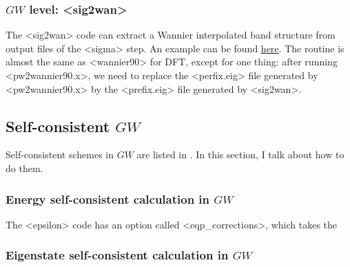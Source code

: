 \documentclass[hyperref, a4paper]{report}
\def\texttt#1{<#1>}%
\newcommand{\shortcode}[1]{\texttt{#1}}
\begin{document}
\subsubsection{$GW$ level: \shortcode{sig2wan}}

The \shortcode{sig2wan} code can extract a Wannier interpolated band structure from 
output files of the \shortcode{sigma} step.
An example can be found 
\href{https://github.com/BerkeleyGW/BerkeleyGW-examples/tree/master/DFT/silicon}{here}.
The routine is almost the same as \shortcode{wannier90} for DFT,
except for one thing:
after running \shortcode{pw2wannier90.x},
we need to replace the \shortcode{perfix.eig} file generated by \shortcode{pw2wannier90.x}
by the \shortcode{prefix.eig} file generated by \shortcode{sig2wan}.

\subsection{Self-consistent $GW$}

Self-consistent schemes in $GW$ are listed in .
In this section, 
I talk about how to do them.

\subsubsection{Energy self-consistent calculation in $GW$}

The \shortcode{epsilon} code has an option called \shortcode{eqp_corrections},
which takes the 

\subsubsection{Eigenstate self-consistent calculation in $GW$}
\end{document}
